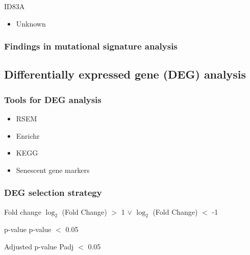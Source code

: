 \documentclass{beamer}
\begin{document}
\begin{frame}
                    \begin{block}{ID83A}
                        \begin{itemize}
                            \item Unknown
                        \end{itemize}
                    \end{block}
                \end{frame}

            \begin{frame}
                \frametitle{Findings in mutational signature analysis}
            \end{frame}

        \subsection{Differentially expressed gene (DEG) analysis}
            \begin{frame}
                \frametitle{Tools for DEG analysis}

                \begin{itemize}
                    \item RSEM \cite{rsem-01}
                    \item Enrichr \cite{enrichr-01}
                    \item KEGG \cite{kegg-01}
                    \item Senescent gene markers \cite{senescent-04}
                \end{itemize}
            \end{frame}

            \begin{frame}
                \frametitle{DEG selection strategy}

                \begin{block}{Fold change}
                    $\log_2$ (Fold Change) $>$ 1 $\vee$ $\log_2$ (Fold Change) $<$ -1
                \end{block}

                \begin{block}{p-value}
                    p-value $<$ 0.05
                \end{block}

                \begin{block}{Adjusted p-value}
                    Padj $<$ 0.05
                \end{block}
            \end{frame}
\end{document}
